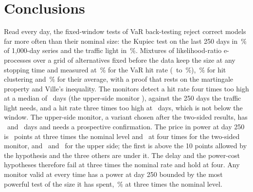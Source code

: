 \section{Conclusions}
\label{sec:conclusions}

Read every day, the fixed-window tests of VaR back-testing reject correct models far more often than their nominal size: the Kupiec test on the last 250 days in \nNullSizeKupTrail\,\% of 1,000-day series and the traffic light in \nNullSizeLight\,\%. Mixtures of likelihood-ratio e-processes over a grid of alternatives fixed before the data keep the size at any stopping time and measured at \nNullSizeE\,\% for the VaR hit rate (\nNullSizeELo\ to \nNullSizeEHi\,\%), \nNullSizeCluster\,\% for hit clustering and \nNullSizeBattery\,\% for their average, with a proof that rests on the martingale property and Ville's inequality.
The monitors detect a hit rate four times too high at a median of \nSeedsFourMed\ days (the upper-side monitor \nSeedsUpFourMed), against the 250 days the traffic light needs, and a hit rate three times too high at \nSeedsThreeMed\ days, which is not below the window. The upper-side monitor, a variant chosen after the two-sided results, has \nSeedsUpFourMed\ and \nSeedsUpThreeMed\ days and needs a prospective confirmation. The price in power at day 250 is \nSeedsThreeCost\ points at three times the nominal level and \nSeedsFourCost\ at four times for the two-sided monitor, and \nSeedsUpThreeCost\ and \nSeedsUpFourCost\ for the upper side;
the first is above the 10 points allowed by the hypothesis and the three others are under it. The delay and the power-cost hypotheses therefore fail at three times the nominal rate and hold at four. Any monitor valid at every time has a power at day 250 bounded by the most powerful test of the size it has spent, \nExactThreeNpE\,\% at three times the nominal level.

